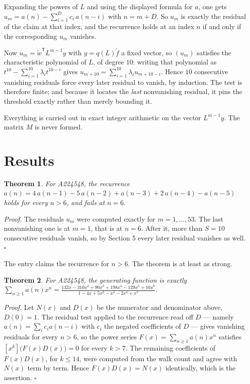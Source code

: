 \documentclass[11pt]{article}
\newtheorem{theorem}{Theorem}
\theoremstyle{definition}
\begin{document}
Expanding the powers of $L$ and using the displayed formula for $a$, one gets $u_m = a(n) - \sum_{i=1}^{D} c_i\,a(n-i)$ with $n = m + D$. So $u_m$ is exactly the residual of the claim at that index, and the recurrence holds at an index $n$ if and only if the corresponding $u_m$ vanishes.

Now $u_m = \tilde w^{\mathsf T} L^{m-1} y$ with $y = q(L)\tilde f$ a fixed vector, so $(u_m)$ satisfies the characteristic polynomial of $L$, of degree $10$: writing that polynomial as $t^{10} - \sum_{i=1}^{10} \lambda_i t^{10-i}$ gives $u_{m+10} = \sum_{i=1}^{10} \lambda_i u_{m+10-i}$. Hence $10$ consecutive vanishing residuals force every later residual to vanish, by induction. The test is therefore finite; and because it locates the {\itshape last} nonvanishing residual, it pins the threshold exactly rather than merely bounding it.

Everything is carried out in exact integer arithmetic on the vector $L^{m-1}y$. The matrix $M$ is never formed.

\section{Results}

\begin{theorem} For A224548, the recurrence $a(n) = 4\,a(n-1) - 5\,a(n-2) + a(n-3) + 2\,a(n-4) - a(n-5)$ holds for every $n > 6$, and fails at $n = 6$.\end{theorem}

{\itshape Proof.} The residuals $u_m$ were computed exactly for $m = 1,\dots,53$. The last nonvanishing one is at $m = 1$, that is at $n = 6$. After it, more than $S = 10$ consecutive residuals vanish, so by Section 5 every later residual vanishes as well. $\square$

The entry claims the recurrence for $n > 6$. The theorem is at least as strong.

\begin{theorem} For A224548, the generating function is exactly $\sum_{n\ge 1} a(n)x^n = \frac{132x - 310x^{2} + 90x^{3} + 198x^{4} - 129x^{5} + 10x^{6}}{1 - 4x + 5x^{2} - x^{3} - 2x^{4} + x^{5}}$.\end{theorem}

{\itshape Proof.} Let $N(x)$ and $D(x)$ be the numerator and denominator above, $D(0)=1$. The residual test applied to the recurrence read off $D$ --- namely $a(n) = \sum_i c_i a(n-i)$ with $c_i$ the negated coefficients of $D$ --- gives vanishing residuals for every $n > 6$, so the power series $F(x)=\sum_{n\ge 1}a(n)x^n$ satisfies $[x^k]\bigl(F(x)D(x)\bigr) = 0$ for every $k > 7$. The remaining coefficients of $F(x)D(x)$, for $k \le 14$, were computed from the walk count and agree with $N(x)$ term by term. Hence $F(x)D(x) = N(x)$ identically, which is the assertion. $\square$
\end{document}
